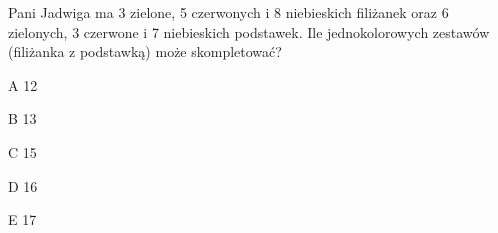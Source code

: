 \begin{tresc}
Pani Jadwiga ma 3 zielone, 5 czerwonych i 8 niebieskich filiżanek oraz 6 zielonych, 3 czerwone i 7 niebieskich podstawek. Ile jednokolorowych zestawów (filiżanka z podstawką) może skompletować?
\end{tresc}
\begin{wariant}{A} 12 \end{wariant}
\begin{wariant}{B} 13 \end{wariant}
\begin{wariant}{C} 15 \end{wariant}
\begin{wariant}{D} 16 \end{wariant}
\begin{wariant}{E} 17 \end{wariant}
